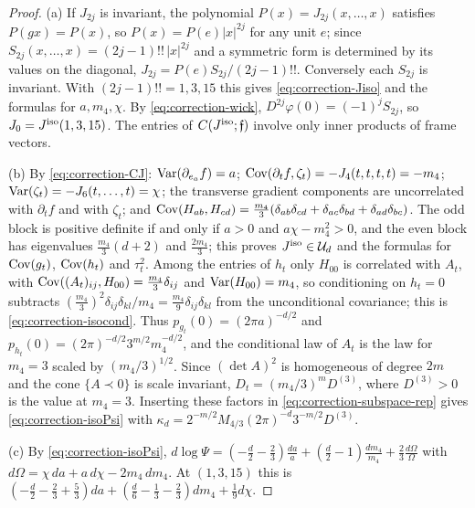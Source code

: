 \begin{proof}
(a) If $J_{2j}$ is invariant, the polynomial $P(x)=J_{2j}(x,\dots,x)$ satisfies $P(gx)=P(x)$, so $P(x)=P(e)|x|^{2j}$ for any unit $e$; since $S_{2j}(x,\dots,x)=(2j-1)!!\,|x|^{2j}$ and a symmetric form is determined by its values on the diagonal, $J_{2j}=P(e)S_{2j}/(2j-1)!!$. Conversely each $S_{2j}$ is invariant. With $(2j-1)!!=1,3,15$ this gives \eqref{eq:correction-Jiso} and the formulas for $a,m_4,\chi$. By \eqref{eq:correction-wick}, $D^{2j}\varphi(0)=(-1)^jS_{2j}$, so $J_0=J^{\rm iso}(1,3,15)$. The entries of $C(J^{\rm iso};\mathfrak f)$ involve only inner products of frame vectors.

(b) By \eqref{eq:correction-CJ}: $\operatorname{Var}(\partial_{e_a}f)=a$; $\operatorname{Cov}(\partial_tf,\zeta_t)=-J_4(t,t,t,t)=-m_4$; $\operatorname{Var}(\zeta_t)=-J_6(t,\dots,t)=\chi$; the transverse gradient components are uncorrelated with $\partial_tf$ and with $\zeta_t$; and $\operatorname{Cov}(H_{ab},H_{cd})=\frac{m_4}3(\delta_{ab}\delta_{cd}+\delta_{ac}\delta_{bd}+\delta_{ad}\delta_{bc})$. The odd block is positive definite if and only if $a>0$ and $a\chi-m_4^2>0$, and the even block has eigenvalues $\frac{m_4}3(d+2)$ and $\frac{2m_4}3$; this proves $J^{\rm iso}\in\mathcal U_d$ and the formulas for $\operatorname{Cov}(g_t)$, $\operatorname{Cov}(h_t)$ and $\tau_t^2$. Among the entries of $h_t$ only $H_{00}$ is correlated with $A_t$, with $\operatorname{Cov}((A_t)_{ij},H_{00})=\frac{m_4}3\delta_{ij}$ and $\operatorname{Var}(H_{00})=m_4$, so conditioning on $h_t=0$ subtracts $(\frac{m_4}3)^2\delta_{ij}\delta_{kl}/m_4=\frac{m_4}9\delta_{ij}\delta_{kl}$ from the unconditional covariance; this is \eqref{eq:correction-isocond}. Thus $p_{g_t}(0)=(2\pi a)^{-d/2}$ and $p_{h_t}(0)=(2\pi)^{-d/2}3^{m/2}m_4^{-d/2}$, and the conditional law of $A_t$ is the law for $m_4=3$ scaled by $(m_4/3)^{1/2}$. Since $(\det A)^2$ is homogeneous of degree $2m$ and the cone $\{A\prec0\}$ is scale invariant, $D_t=(m_4/3)^mD^{(3)}$, where $D^{(3)}>0$ is the value at $m_4=3$. Inserting these factors in \eqref{eq:correction-subspace-rep} gives \eqref{eq:correction-isoPsi} with $\kappa_d=2^{-m/2}M_{4/3}(2\pi)^{-d}3^{-m/2}D^{(3)}$.

(c) By \eqref{eq:correction-isoPsi}, $d\log\Psi=(-\frac d2-\frac23)\frac{da}a+(\frac d2-1)\frac{dm_4}{m_4}+\frac23\frac{d\Omega}\Omega$ with $d\Omega=\chi\,da+a\,d\chi-2m_4\,dm_4$. At $(1,3,15)$ this is $(-\frac d2-\frac23+\frac53)da+(\frac d6-\frac13-\frac23)dm_4+\frac19d\chi$.
\end{proof}

